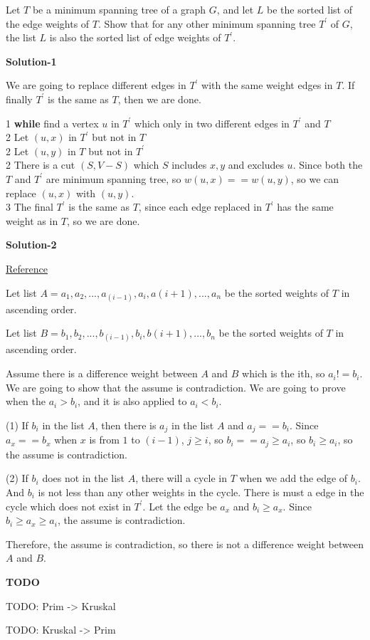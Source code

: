 Let $T$ be a minimum spanning tree of a graph $G$, and let $L$ be the sorted
list of the edge weights of $T$. Show that for any other minimum spanning tree
$T^{'}$ of $G$, the list $L$ is also the sorted list of edge weights of $T^{'}$.

\textbf{Solution-1}

We are going to replace different edges in $T^{'}$ with the same weight edges
in $T$. If finally $T^{'}$ is the same as $T$, then we are done.

1 \space \textbf{while} find a vertex $u$ in $T^{'}$ which only in two different
edges in $T^{'}$ and $T$ \\
2 \space \space \space Let $(u, x)$ in $T^{'}$ but not in $T$ \\
2 \space \space \space Let $(u, y)$ in $T$ but not in $T^{'}$ \\
2 \space \space \space There is a cut $(S, V - S)$ which $S$ includes $x, y$ and
excludes $u$. Since both the $T$ and $T^{'}$ are minimum spanning tree, so
$w(u, x) == w(u, y)$, so we can replace $(u, x)$ with $(u, y)$.\\
3 \space The final $T^{'}$ is the same as $T$, since each edge replaced in $T^{'}$
has the same weight as in $T$, so we are done.

\textbf{Solution-2}

\href{https://github.com/gzc/CLRS/}{Reference}

Let list $A = { a_1, a_2, ... , a_(i-1), a_i, a(i+1), ..., a_n }$ be the sorted
weights of $T$ in ascending order.

Let list $B = { b_1, b_2, ... , b_(i-1), b_i, b(i+1), ..., b_n }$ be the sorted
weights of $T$ in ascending order.

Assume there is a difference weight between $A$ and $B$ which is the ith, so
$a_i != b_i$. We are going to show that the assume is contradiction. We are
going to prove when the $a_i > b_i$, and it is also applied to $a_i < b_i$.

(1) If $b_i$ in the list $A$, then there is $a_j$ in the list $A$ and
$a_j == b_i$. Since $a_x == b_x$ when $x$ is from $1$ to $(i - 1)$, $j \geq i$,
so $b_i == a_j \geq a_i$, so $b_i \geq a_i$, so the assume is contradiction.

(2) If $b_i$ does not in the list $A$, there will a cycle in $T$ when we add
the edge of $b_i$. And $b_i$ is not less than any other weights in the cycle.
There is must a edge in the cycle which does not exist in $T^{'}$. Let the edge
be $a_x$ and $b_i \geq a_x$. Since $b_i \geq a_x \geq a_i$, the assume is
contradiction.

Therefore, the assume is contradiction, so there is not a difference weight
between $A$ and $B$.

\textbf{TODO}

TODO: Prim -> Kruskal

TODO: Kruskal -> Prim
